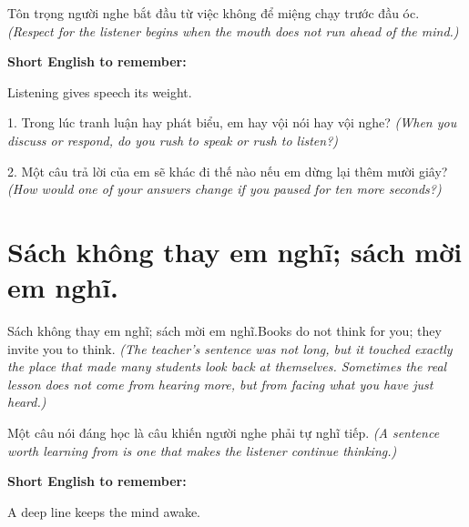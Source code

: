 \begin{baihoc}
Tôn trọng người nghe bắt đầu từ việc không để miệng chạy trước đầu óc.
\textit{(Respect for the listener begins when the mouth does not run ahead of the mind.)}
\end{baihoc}

\begin{ghinhoanh}
\textbf{Short English to remember:}

Listening gives speech its weight.

\end{ghinhoanh}

\begin{tuhocnhanh}
1. Trong lúc tranh luận hay phát biểu, em hay vội nói hay vội nghe? \textit{(When you discuss or respond, do you rush to speak or rush to listen?)}

2. Một câu trả lời của em sẽ khác đi thế nào nếu em dừng lại thêm mười giây? \textit{(How would one of your answers change if you paused for ten more seconds?)}
\end{tuhocnhanh}
\ngancach


\section{Sách không thay em nghĩ; sách mời em nghĩ.}
\begin{truyen}{Sách không thay em nghĩ; sách mời em nghĩ.}{Books do not think for you; they invite you to think.}
\textit{(The teacher's sentence was not long, but it touched exactly the place that made many students look back at themselves. Sometimes the real lesson does not come from hearing more, but from facing what you have just heard.)}
\end{truyen}

\begin{baihoc}
Một câu nói đáng học là câu khiến người nghe phải tự nghĩ tiếp.
\textit{(A sentence worth learning from is one that makes the listener continue thinking.)}
\end{baihoc}

\begin{ghinhoanh}
\textbf{Short English to remember:}

A deep line keeps the mind awake.

\end{ghinhoanh}

